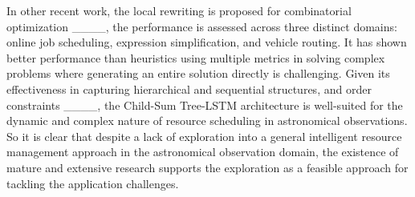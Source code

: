 In other recent work, the local rewriting is proposed for combinatorial optimization ____, the performance is assessed across three distinct domains: online job scheduling, expression simplification, and vehicle routing. It has shown better performance than heuristics using multiple metrics in solving complex problems where generating an entire solution directly is challenging. Given its effectiveness in capturing hierarchical and sequential structures, and order constraints ____, the Child-Sum Tree-LSTM architecture is well-suited for the dynamic and complex nature of resource scheduling in astronomical observations. So it is clear that despite a lack of exploration into a general intelligent resource management approach in the astronomical observation domain, the existence of mature and extensive research supports the exploration as a feasible approach for tackling the application challenges.